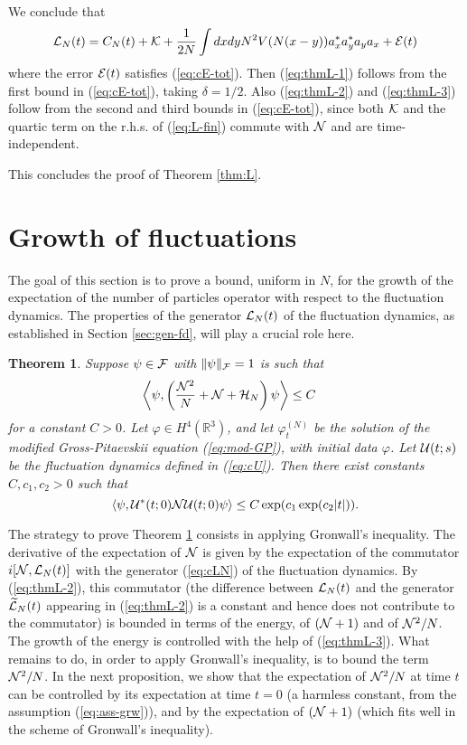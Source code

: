 \documentclass[11pt,a4paper]{article}
\newtheorem{thm}{Theorem}[section]  %
\newcommand{\cU}{{\cal U}}
\newcommand{\bR}{{\mathbb R}}
\newcommand{\wt}{\widetilde}
\newcommand{\cF}{{\cal F}}
\newcommand{\cE}{{\cal E}}
\newcommand{\cK}{{\cal K}}
\newcommand{\cH}{{\cal H}}
\newcommand{\cL}{{\cal L}}
\newcommand{\cN}{{\cal N}}
\begin{document}
We conclude that
\begin{equation}\label{eq:L-fin} \cL_N (t) = C_N (t) + \cK  + \frac{1}{2N}  \int dx dy N^2 V (N (x-y)) a_x^* a_y^* a_y a_x + \cE (t) \end{equation}
where the error $\cE (t)$ satisfies (\ref{eq:cE-tot}). Then (\ref{eq:thmL-1}) follows from the first bound in (\ref{eq:cE-tot}), taking $\delta = 1/2$. Also (\ref{eq:thmL-2}) and (\ref{eq:thmL-3}) follow from the second and third bounds in (\ref{eq:cE-tot}), since both $\cK$ and the quartic term on the r.h.s. of (\ref{eq:L-fin}) commute with $\cN$ and are time-independent. 

This concludes the proof of Theorem \ref{thm:L}.

\section{Growth of fluctuations}
\label{s:growthoffluct}
The goal of this section is to prove a bound, uniform in $N$, for the growth of the expectation of the number of particles operator with respect to the fluctuation dynamics. The properties of the generator $\cL_N (t)$ of the fluctuation dynamics, as established in Section \ref{sec:gen-fd}, will play a crucial role here.

\begin{thm}\label{thm:N}
Suppose $\psi \in \cF$ with $\| \psi \|_\cF  =1$ is such that \begin{equation}\label{eq:ass-grw} \begin{split} \left\langle \psi , \left( \frac{\cN^2}{N} + \cN + \cH_N \right) \psi \right\rangle &\leq C  \end{split} \end{equation}
for a constant $C>0$. Let $\varphi \in H^4 (\bR^3)$, and let $\varphi_t^{(N)}$ be the solution of the modified Gross-Pitaevskii equation (\ref{eq:mod-GP}), with initial data $\varphi$. Let $\cU (t;s)$ be the fluctuation dynamics defined in (\ref{eq:cU}). Then there exist constants $C,c_1,c_2 > 0$ such that
\[ \langle \psi , \cU^* (t;0) \cN \cU (t;0) \psi \rangle \leq C \exp (c_1 \exp (c_2 |t|)). \] 
\end{thm}

The strategy to prove Theorem \ref{thm:N} consists in applying Gronwall's inequality. The derivative of the expectation of $\cN$ is given by the expectation of the commutator $i[\cN , \cL_N (t)]$ with the generator (\ref{eq:cLN}) of the fluctuation dynamics. By (\ref{eq:thmL-2}), this commutator (the difference between $\cL_N (t)$ and the generator $\wt{\cL}_N (t)$ appearing in (\ref{eq:thmL-2}) is a constant and hence does not contribute to the commutator) is bounded in terms of the energy, of $(\cN+ 1)$ and of $\cN^2/N$. The growth of the energy is controlled with the help of (\ref{eq:thmL-3}). What remains to do, in order to apply Gronwall's inequality, is to bound the term $\cN^2 / N$. In the next proposition, we show that the expectation of $\cN^2/N$ at time $t$ can be controlled by its expectation at time $t=0$ (a harmless constant, from the assumption (\ref{eq:ass-grw})), and by the expectation of $(\cN+1)$ (which fits well in the scheme of Gronwall's inequality). 
\end{document}
